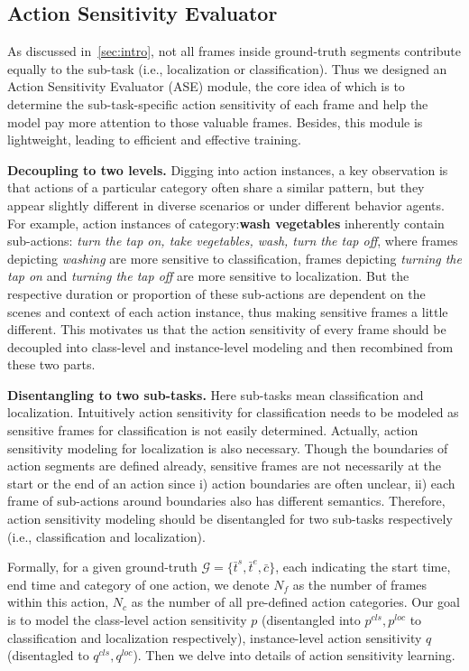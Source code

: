 \documentclass[10pt,twocolumn,letterpaper]{article}
\begin{document}
\subsection{Action Sensitivity Evaluator}
\par As discussed in~\ref{sec:intro}, not all frames inside ground-truth segments contribute equally to the sub-task (i.e., localization or classification). Thus we designed an Action Sensitivity Evaluator (ASE) module, the core idea of which is to determine the sub-task-specific action sensitivity of each frame and help the model pay more attention to those valuable frames. Besides, this module is lightweight, leading to efficient and effective training.
\par \textbf{Decoupling to two levels.} Digging into action instances, a key observation is that actions of a particular category often share a similar pattern, but they appear slightly different in diverse scenarios or under different behavior agents. For example,  action instances of category:\textbf{wash vegetables} inherently contain sub-actions: \textit{turn the tap on, take vegetables, wash, turn the tap off},  where frames depicting \textit{washing} are more sensitive to classification,  frames depicting \textit{turning the tap on} and \textit{turning the tap off} are more sensitive to localization. But the respective duration or proportion of these sub-actions are dependent on the scenes and context of each action instance, thus making sensitive frames a little different. This motivates us that the action sensitivity of every frame should be decoupled into class-level and instance-level modeling and then recombined from these two parts. 

\textbf{Disentangling to two sub-tasks.} Here sub-tasks mean classification and localization. Intuitively action sensitivity for classification needs to be modeled as sensitive frames for classification is not easily determined. Actually, action sensitivity modeling for localization is also necessary. Though the boundaries of action segments are defined already, sensitive frames are not necessarily at the start or the end of an action since i) action boundaries are often unclear, ii) each frame of sub-actions around boundaries also has different semantics. Therefore, action sensitivity modeling should be disentangled for two sub-tasks respectively (i.e., classification and localization). 

\par Formally, for a given ground-truth $\mathcal{G}\!=\!\{\bar t^s, \bar t^e, \bar c\}$, each indicating the start time, end time and category of one action, we denote $N_f$ as the number of frames within this action, $N_c$ as the number of all pre-defined action categories. Our goal is to model the class-level action sensitivity $p$ (disentangled into $p^{cls},p^{loc}$ to classification and localization respectively), instance-level action sensitivity $q$ (disentagled to $q^{cls}, q^{loc}$).  Then we delve into details of action sensitivity learning.
\end{document}
